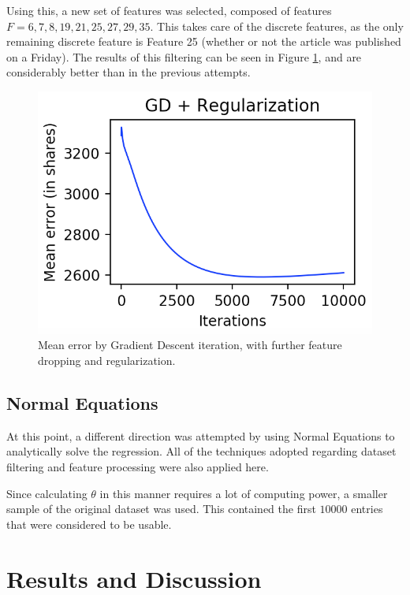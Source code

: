 \documentclass[10pt,twocolumn,letterpaper]{article}
\begin{document}
Using this, a new set of features was selected, composed of features $F = {6,7,8,19,21,25,27,29,35}$. This takes care of the discrete features, as the only remaining discrete feature is Feature 25 (whether or not the article was published on a Friday). The results of this filtering can be seen in Figure \ref{fig:gd4}, and are considerably better than in the previous attempts.

\begin{figure}
\begin{center}
	\includegraphics[width=0.99\columnwidth]{pics/gd4.png}
	\caption{Mean error by Gradient Descent iteration, with further feature dropping and regularization.\label{fig:gd4}} 
\end{center} 
\end{figure}

\subsection{Normal Equations}

At this point, a different direction was attempted by using Normal Equations to analytically solve the regression. All of the techniques adopted regarding dataset filtering and feature processing were also applied here. 

Since calculating $\theta$ in this manner requires a lot of computing power, a smaller sample of the original dataset was used. This contained the first $10000$ entries that were considered to be usable.

\section{Results and Discussion}
\end{document}
